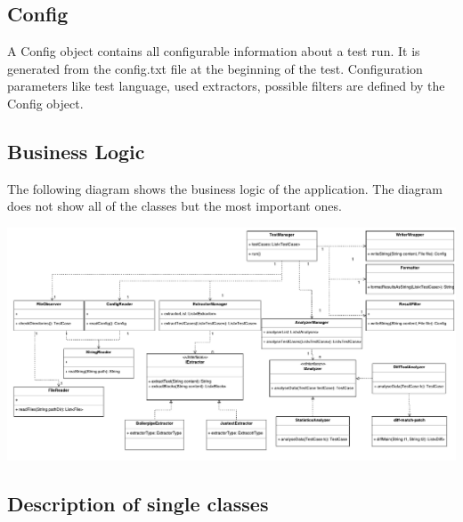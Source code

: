 \subsection{Config}
A Config object contains all configurable information about a test run. It is generated from the config.txt file at the beginning of the test. Configuration parameters like test language, used extractors, possible filters are defined by the Config object.
\begin{landscape}

\subsection{Business Logic}
\label{subsec:Business Logic}

The following diagram shows the business logic of the application. The diagram does not show all of the classes but the most important ones. 

\includegraphics[width=23cm]{Figures/architecutre.pdf}


\end{landscape}



\pagebreak
\subsection{Description of single classes}

